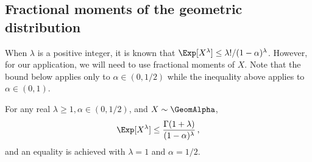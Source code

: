 \subsection{Fractional moments of the geometric distribution}
When $\lambda$ is a positive integer, it is known that 
$\Exp[X^\lambda] \leq \lambda!/(1-\alpha)^\lambda$. 
However, 
for our application, 
we will need to use fractional moments of $X$. 
Note that the bound below applies only to $\alpha \in (0, 1/2)$ 
while the inequality above applies to $\alpha \in (0,1)$.

\begin{proposition}\label{prop:geom-moment-bound}
    For any real $\lambda \geq 1, \alpha \in (0, 1/2)$, and $X \sim \GeomAlpha$,
    \begin{equation}\label{eq:geom-moment-bound}
        \Exp[X^\lambda] \leq \frac{\Gamma(1+\lambda)}{(1-\alpha)^\lambda} 
        \, ,
    \end{equation}
    and an equality is achieved with $\lambda = 1$ and $\alpha = 1/2$.
\end{proposition}
